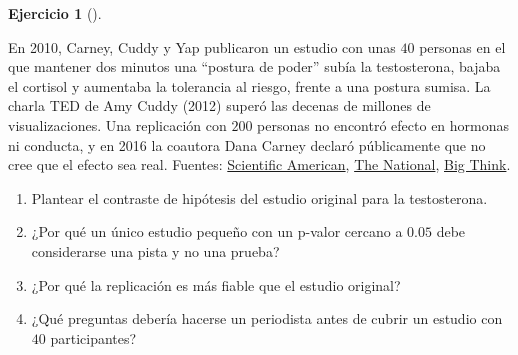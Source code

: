 \documentclass[
  spanish,
  a4paper,
]{scrreport}
\theoremstyle{definition}
\newtheorem{exercise}{Ejercicio}[chapter]
\theoremstyle{remark}
\begin{document}
\begin{exercise}[]\protect\hypertarget{exr-interpretacion-power-posing}{}\label{exr-interpretacion-power-posing}

En 2010, Carney, Cuddy y Yap publicaron un estudio con unas \(40\)
personas en el que mantener dos minutos una ``postura de poder'' subía
la testosterona, bajaba el cortisol y aumentaba la tolerancia al riesgo,
frente a una postura sumisa. La charla TED de Amy Cuddy (2012) superó
las decenas de millones de visualizaciones. Una replicación con \(200\)
personas no encontró efecto en hormonas ni conducta, y en 2016 la
coautora Dana Carney declaró públicamente que no cree que el efecto sea
real. Fuentes:
\href{https://www.scientificamerican.com/podcast/episode/power-poses-dont-stand-up}{Scientific
American},
\href{https://www.thenationalnews.com/uae/rise-of-the-zombie-facts-1.66288}{The
National}, \href{https://develop-plus.bigthink.com/?p=52729}{Big Think}.

\begin{enumerate}
\def\labelenumi{\alph{enumi}.}
\item
  Plantear el contraste de hipótesis del estudio original para la
  testosterona.
\item
  ¿Por qué un único estudio pequeño con un p-valor cercano a \(0.05\)
  debe considerarse una pista y no una prueba?
\item
  ¿Por qué la replicación es más fiable que el estudio original?
\item
  ¿Qué preguntas debería hacerse un periodista antes de cubrir un
  estudio con \(40\) participantes?
\end{enumerate}

\end{exercise}
\end{document}
